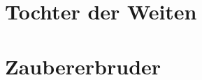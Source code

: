 \documentclass{article}
\begin{document}
    \section{Tochter der Weiten}
    
    \newpage
    \section{Zaubererbruder}
     
\end{document}

